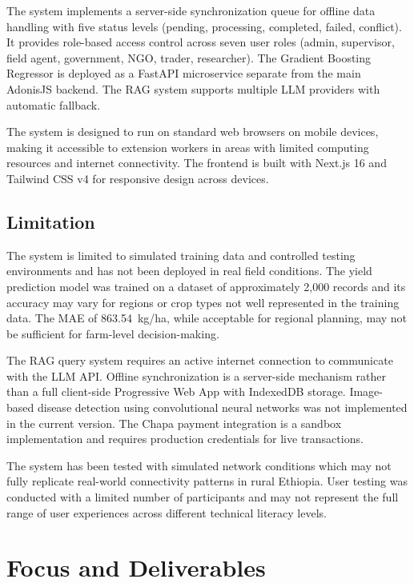 The system implements a server-side synchronization queue for offline data handling with five status levels (pending, processing, completed, failed, conflict). It provides role-based access control across seven user roles (admin, supervisor, field agent, government, NGO, trader, researcher). The Gradient Boosting Regressor is deployed as a FastAPI microservice separate from the main AdonisJS backend. The RAG system supports multiple LLM providers with automatic fallback.

The system is designed to run on standard web browsers on mobile devices, making it accessible to extension workers in areas with limited computing resources and internet connectivity. The frontend is built with Next.js 16 and Tailwind CSS v4 for responsive design across devices.

\subsection{Limitation}

The system is limited to simulated training data and controlled testing environments and has not been deployed in real field conditions. The yield prediction model was trained on a dataset of approximately 2,000 records and its accuracy may vary for regions or crop types not well represented in the training data. The MAE of 863.54~kg/ha, while acceptable for regional planning, may not be sufficient for farm-level decision-making.

The RAG query system requires an active internet connection to communicate with the LLM API. Offline synchronization is a server-side mechanism rather than a full client-side Progressive Web App with IndexedDB storage. Image-based disease detection using convolutional neural networks was not implemented in the current version. The Chapa payment integration is a sandbox implementation and requires production credentials for live transactions.

The system has been tested with simulated network conditions which may not fully replicate real-world connectivity patterns in rural Ethiopia. User testing was conducted with a limited number of participants and may not represent the full range of user experiences across different technical literacy levels.

\section{Focus and Deliverables}

